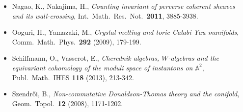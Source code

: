 \documentclass[11pt]{article}
\begin{document}
\begin{itemize}
{      $3$-folds and counting invariants}, Q.\ J.\ Math.\ \textbf{63}
      (2012), 965-1007.
\item Nagao, K., Nakajima, H., \emph{Counting invariant of perverse
      coherent sheaves and its wall-crossing}, Int.\ Math.\ Res.\ Not.\
      \textbf{2011}, 3885-3938.
\item Ooguri, H., Yamazaki, M., \emph{Crystal melting and toric
      Calabi-Yau manifolds}, Comm.\ Math.\ Phys.\ \textbf{292} (2009), 179-199.
\item Schiffmann, O., Vasserot, E., \emph{Cherednik algebras, $W$-algebras
      and the equivariant cohomology of the moduli space of instantons
      on $\mathbb{A}^{2}$}, Publ.\ Math.\ IHES \textbf{118} (2013), 213-342.
\item Szendr\H{o}i, B., \emph{Non-commutative Donaldson-Thomas theory and
      the conifold}, Geom.\ Topol.\ \textbf{12} (2008), 1171-1202.
\end{itemize}
\end{document}
